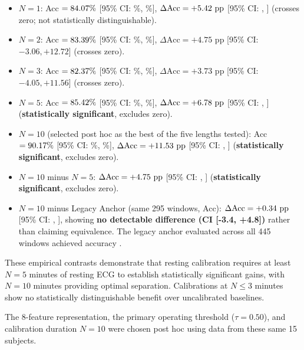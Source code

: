 \documentclass[conference]{IEEEtran}
\begin{document}
\begin{itemize}
    \item $N=1$: Acc $= 84.07\%$ [95\% CI: \valNoneAccCILow\%, \valNoneAccCIHigh\%], $\Delta\text{Acc} = +5.42\text{ pp}$ [95\% CI: \valPairedGainNoneCILow, \valPairedGainNoneCIHigh] (crosses zero; not statistically distinguishable).
    \item $N=2$: Acc $= 83.39\%$ [95\% CI: \valNtwoAccCILow\%, \valNtwoAccCIHigh\%], $\Delta\text{Acc} = +4.75\text{ pp}$ [95\% CI: $-3.06, +12.72$] (crosses zero).
    \item $N=3$: Acc $= 82.37\%$ [95\% CI: \valNthreeAccCILow\%, \valNthreeAccCIHigh\%], $\Delta\text{Acc} = +3.73\text{ pp}$ [95\% CI: $-4.05, +11.56$] (crosses zero).
    \item $N=5$: Acc $= 85.42\%$ [95\% CI: \valNfiveAccCILow\%, \valNfiveAccCIHigh\%], $\Delta\text{Acc} = +6.78\text{ pp}$ [95\% CI: \valPairedGainNfiveCILow, \valPairedGainNfiveCIHigh] (\textbf{statistically significant}, excludes zero).
    \item $N=10$ (selected post hoc as the best of the five lengths tested): Acc $= 90.17\%$ [95\% CI: \valNtenAccCILow\%, \valNtenAccCIHigh\%], $\Delta\text{Acc} = +11.53\text{ pp}$ [95\% CI: \valPairedGainNtenCILow, \valPairedGainNtenCIHigh] (\textbf{statistically significant}, excludes zero).
    \item $N=10$ minus $N=5$: $\Delta\text{Acc} = +4.75\text{ pp}$ [95\% CI: \valPairedGainNtenVsNfiveCILow, \valPairedGainNtenVsNfiveCIHigh] (\textbf{statistically significant}, excludes zero).
    \item $N=10$ minus Legacy Anchor (same 295 windows, \valControlLeakyTwoNineFiveAccPct Acc): $\Delta\text{Acc} = +0.34\text{ pp}$ [95\% CI: \valPairedGainNtenVsLeakyCILow, \valPairedGainNtenVsLeakyCIHigh], showing \textbf{no detectable difference (CI [-3.4, +4.8])} rather than claiming equivalence. The legacy anchor evaluated across all 445 windows achieved \valLegacyFourFourFiveAccPct accuracy \valLegacyFourFourFiveAccCI.
\end{itemize}
These empirical contrasts demonstrate that resting calibration requires at least $N=5$ minutes of resting ECG to establish statistically significant gains, with $N=10$ minutes providing optimal separation. Calibrations at $N \le 3$ minutes show no statistically distinguishable benefit over uncalibrated baselines.

The 8-feature representation, the primary operating threshold ($\tau = 0.50$), and calibration duration $N=10$ were chosen post hoc using data from these same 15 subjects.
\end{document}
